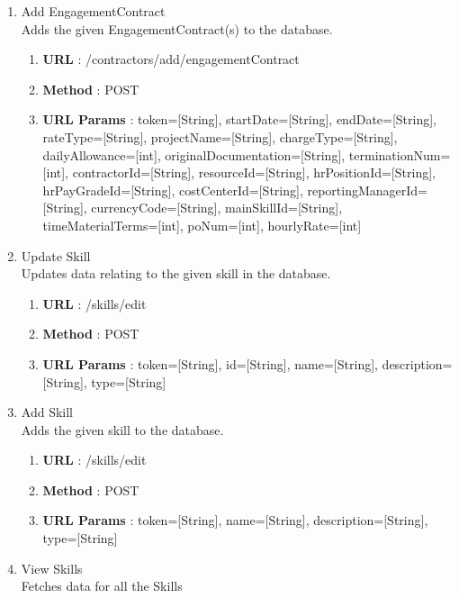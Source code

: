 \documentclass[11pt, titlepage]{article}
\begin{document}
\begin{enumerate}
\begin{enumerate}
                \end{enumerate}
        \item Add EngagementContract \\
             Adds the given EngagementContract(s) to the database.
                \begin{enumerate}
                    \item \textbf{URL} : /contractors/add/engagementContract
                    \item \textbf{Method} : POST
                    \item \textbf{URL Params} : token=[String], startDate=[String], endDate=[String], rateType=[String], projectName=[String], chargeType=[String], dailyAllowance=[int], originalDocumentation=[String], terminationNum=[int], contractorId=[String], resourceId=[String], hrPositionId=[String], hrPayGradeId=[String], costCenterId=[String], reportingManagerId=[String], currencyCode=[String], mainSkillId=[String], timeMaterialTerms=[int], poNum=[int], hourlyRate=[int]
                \end{enumerate}
        \item Update Skill \\ 
             Updates data relating to the given skill in the database.
                \begin{enumerate}
                    \item \textbf{URL} : /skills/edit
                    \item \textbf{Method} : POST
                    \item \textbf{URL Params} : token=[String], id=[String], name=[String], description=[String], type=[String]
                \end{enumerate}
        \item Add Skill \\
             Adds the given skill to the database.
                \begin{enumerate}
                    \item \textbf{URL} : /skills/edit
                    \item \textbf{Method} : POST
                    \item \textbf{URL Params} : token=[String], name=[String], description=[String], type=[String]
                \end{enumerate}
        \item View Skills \\
             Fetches data for all the Skills

\end{enumerate}
\end{document}
